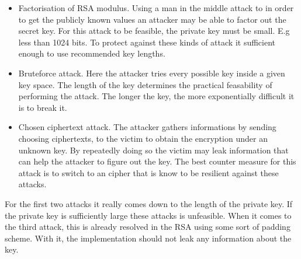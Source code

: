 \begin {itemize}

\item Factorisation of RSA modulus. Using a man in the middle attack to in order to get the publicly known values an attacker may be able to factor out the secret key. For this attack to be feasible, the private key must be small. E.g less than 1024 bits. To protect against these kinds of attack it sufficient enough to use recommended key lengths. \cite {nisc}  

\item Bruteforce attack. Here the attacker tries every possible key inside a given key space. The length of the key determines the practical feasability of performing the attack. The longer the key, the more exponentially difficult it is to break it. 

\item Chosen ciphertext attack. The attacker gathers informations by sending choosing ciphertexts, to the victim to obtain the encryption under an unknown key. By repeatedly doing so the victim may leak information that can help the attacker to figure out the key. The best counter measure for this attack is to switch to an cipher that is know to be resilient against these attacks. 
\end {itemize}

\noindent
For the first two attacks it really comes down to the length of the private key. If the private key is sufficiently large these attacks is unfeasible. When it comes to the third attack, this is already resolved in the RSA using some sort of padding scheme. With it, the implementation should not leak any information about the key. %


